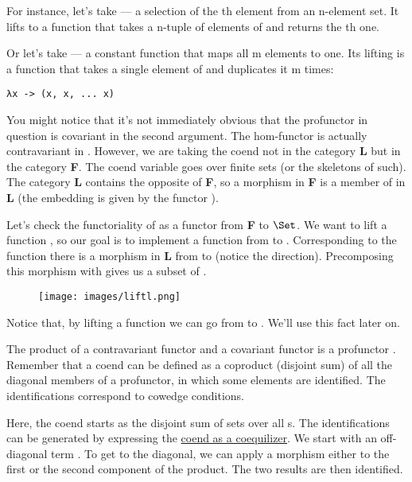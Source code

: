 \noindent
For instance, let's take  --- a
selection of the th element from an n-element set. It lifts to
a function that takes a n-tuple of elements of  and returns
the th one.

Or let's take  --- a constant
function that maps all m elements to one. Its lifting is a function that
takes a single element of  and duplicates it m times:

\begin{Verbatim}[commandchars=\\\{\}]
λx -> (x, x, ... x)
\end{Verbatim}
You might notice that it's not immediately obvious that the profunctor
in question is covariant in the second argument. The hom-functor
 is actually contravariant in . However, we
are taking the coend not in the category \textbf{L} but in the category
\textbf{F}. The coend variable  goes over finite sets (or the
skeletons of such). The category \textbf{L} contains the opposite of
\textbf{F}, so a morphism  in \textbf{F}
is a member of  in \textbf{L} (the embedding is given
by the functor ).

Let's check the functoriality of  as a functor from
\textbf{F} to $\Set$. We want to lift a function
, so our goal is to implement a
function from  to . Corresponding to
the function  there is a morphism in \textbf{L} from
 to  (notice the direction). Precomposing this
morphism with  gives us a subset of
.

\begin{figure}[H]
\centering
\texttt{[image: images/liftl.png]}
\end{figure}

\noindent
Notice that, by lifting a function  we can go
from  to . We'll use this fact later
on.

The product of a contravariant functor  and a covariant
functor  is a profunctor
. Remember that a coend can be defined
as a coproduct (disjoint sum) of all the diagonal members of a
profunctor, in which some elements are identified. The identifications
correspond to cowedge conditions.

Here, the coend starts as the disjoint sum of sets
 over all s. The identifications can
be generated by expressing the
\hyperref[ends-and-coends]{coend as
a coequilizer}. We start with an off-diagonal term
. To get to the diagonal, we can apply a
morphism  either to the first or
the second component of the product. The two results are then
identified.

